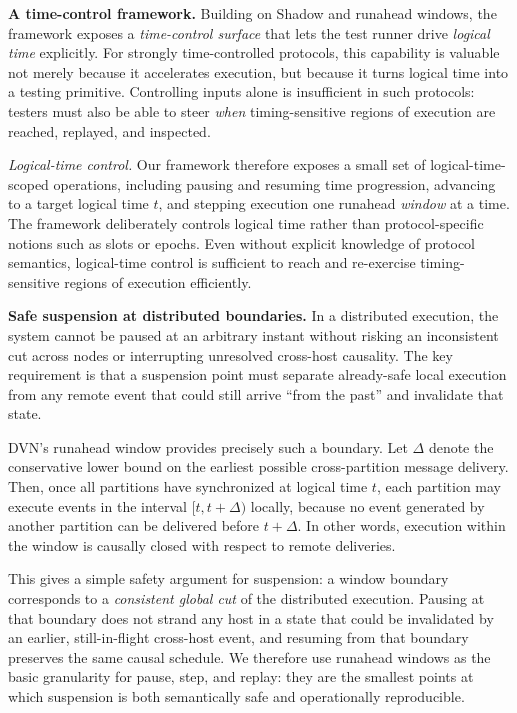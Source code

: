\smallskip
\noindent\textbf{A time-control framework.}
Building on Shadow and runahead windows, the framework exposes a \emph{time-control surface} that lets the test runner drive \emph{logical time} explicitly. For strongly time-controlled protocols, this capability is valuable not merely because it accelerates execution, but because it turns logical time into a testing primitive. Controlling inputs alone is insufficient in such protocols: testers must also be able to steer \emph{when} timing-sensitive regions of execution are reached, replayed, and inspected.

\smallskip
\noindent\emph{Logical-time control.}
Our framework therefore exposes a small set of logical-time-scoped operations, including pausing and resuming time progression, advancing to a target logical time \(t\), and stepping execution one runahead \emph{window} at a time. The framework deliberately controls logical time rather than protocol-specific notions such as slots or epochs. Even without explicit knowledge of protocol semantics, logical-time control is sufficient to reach and re-exercise timing-sensitive regions of execution efficiently.

\smallskip
\noindent\textbf{Safe suspension at distributed boundaries.}
In a distributed execution, the system cannot be paused at an arbitrary instant without risking an inconsistent cut across nodes or interrupting unresolved cross-host causality. The key requirement is that a suspension point must separate already-safe local execution from any remote event that could still arrive ``from the past'' and invalidate that state.

DVN's runahead window provides precisely such a boundary. Let \(\Delta\) denote the conservative lower bound on the earliest possible cross-partition message delivery. Then, once all partitions have synchronized at logical time \(t\), each partition may execute events in the interval \([t, t+\Delta)\) locally, because no event generated by another partition can be delivered before \(t+\Delta\). In other words, execution within the window is causally closed with respect to remote deliveries.

This gives a simple safety argument for suspension: a window boundary corresponds to a \emph{consistent global cut} of the distributed execution. Pausing at that boundary does not strand any host in a state that could be invalidated by an earlier, still-in-flight cross-host event, and resuming from that boundary preserves the same causal schedule. We therefore use runahead windows as the basic granularity for pause, step, and replay: they are the smallest points at which suspension is both semantically safe and operationally reproducible.

